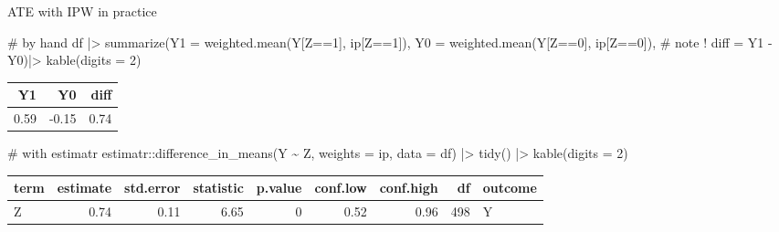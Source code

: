 \documentclass[
  11pt,
  ignorenonframetext,
]{beamer}
\newenvironment{Shaded}{\begin{snugshade}}{\end{snugshade}}
\newcommand{\AttributeTok}[1]{\textcolor[rgb]{0.40,0.45,0.13}{#1}}
\newcommand{\CommentTok}[1]{\textcolor[rgb]{0.37,0.37,0.37}{#1}}
\newcommand{\DecValTok}[1]{\textcolor[rgb]{0.68,0.00,0.00}{#1}}
\newcommand{\FunctionTok}[1]{\textcolor[rgb]{0.28,0.35,0.67}{#1}}
\newcommand{\NormalTok}[1]{\textcolor[rgb]{0.00,0.23,0.31}{#1}}
\newcommand{\SpecialCharTok}[1]{\textcolor[rgb]{0.37,0.37,0.37}{#1}}
\begin{document}
\begin{frame}[fragile]{ATE with IPW in practice}
\protect\hypertarget{ate-with-ipw-in-practice}{}
\begin{Shaded}
\begin{Highlighting}[]
\CommentTok{\# by hand}
\NormalTok{df }\SpecialCharTok{|\textgreater{}}
  \FunctionTok{summarize}\NormalTok{(}\AttributeTok{Y1 =} \FunctionTok{weighted.mean}\NormalTok{(Y[Z}\SpecialCharTok{==}\DecValTok{1}\NormalTok{], ip[Z}\SpecialCharTok{==}\DecValTok{1}\NormalTok{]), }
            \AttributeTok{Y0 =} \FunctionTok{weighted.mean}\NormalTok{(Y[Z}\SpecialCharTok{==}\DecValTok{0}\NormalTok{],  ip[Z}\SpecialCharTok{==}\DecValTok{0}\NormalTok{]), }\CommentTok{\# note !}
            \AttributeTok{diff =}\NormalTok{ Y1 }\SpecialCharTok{{-}}\NormalTok{ Y0)}\SpecialCharTok{|\textgreater{}} 
  \FunctionTok{kable}\NormalTok{(}\AttributeTok{digits =} \DecValTok{2}\NormalTok{)}
\end{Highlighting}
\end{Shaded}

\begin{tabular}{r|r|r}
\hline
Y1 & Y0 & diff\\
\hline
0.59 & -0.15 & 0.74\\
\hline
\end{tabular}

\begin{Shaded}
\begin{Highlighting}[]
\CommentTok{\# with estimatr}
\NormalTok{estimatr}\SpecialCharTok{::}\FunctionTok{difference\_in\_means}\NormalTok{(Y }\SpecialCharTok{\textasciitilde{}}\NormalTok{ Z, }\AttributeTok{weights =}\NormalTok{ ip, }\AttributeTok{data =}\NormalTok{ df) }\SpecialCharTok{|\textgreater{}}
  \FunctionTok{tidy}\NormalTok{() }\SpecialCharTok{|\textgreater{}} \FunctionTok{kable}\NormalTok{(}\AttributeTok{digits =} \DecValTok{2}\NormalTok{)}
\end{Highlighting}
\end{Shaded}

\begin{tabular}{l|r|r|r|r|r|r|r|l}
\hline
term & estimate & std.error & statistic & p.value & conf.low & conf.high & df & outcome\\
\hline
Z & 0.74 & 0.11 & 6.65 & 0 & 0.52 & 0.96 & 498 & Y\\
\hline
\end{tabular}
\end{frame}
\end{document}
